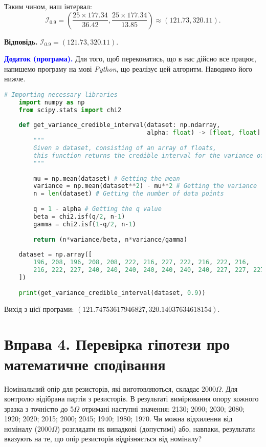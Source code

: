 \documentclass{../hw_template}
\begin{document}
Таким чином, наш інтервал:
\begin{equation*}
    \mathcal{I}_{0.9} = \left(\frac{25 \times 177.34}{36.42}, \frac{25 \times 177.34}{13.85}\right) \approx (121.73, 320.11).
\end{equation*}

\textbf{Відповідь.} $\mathcal{I}_{0.9} = (121.73, 320.11)$.

\textcolor{blue}{\textbf{Додаток (програма).}} Для того, щоб переконатись, що в нас дійсно все працює, напишемо програму на мові \textit{Python}, що реалізує цей алгоритм. Наводимо його нижче.

\begin{lstlisting}[language=Python]
    # Importing necessary libraries
    import numpy as np 
    from scipy.stats import chi2
    
    def get_variance_credible_interval(dataset: np.ndarray,
                                       alpha: float) -> [float, float]:
        """
        Given a dataset, consisting of an array of floats, 
        this function returns the credible interval for the variance of the dataset.
        """
        
        mu = np.mean(dataset) # Getting the mean
        variance = np.mean(dataset**2) - mu**2 # Getting the variance
        n = len(dataset) # Getting the number of data points
        
        q = 1 - alpha # Getting the q value
        beta = chi2.isf(q/2, n-1)
        gamma = chi2.isf(1-q/2, n-1)
        
        return (n*variance/beta, n*variance/gamma)
        
    dataset = np.array([
        196, 208, 196, 208, 208, 222, 216, 227, 222, 216, 222, 216,
        216, 222, 227, 240, 240, 240, 240, 240, 240, 240, 227, 227, 227
    ])
    
    print(get_variance_credible_interval(dataset, 0.9))
\end{lstlisting}

Вихід з цієї програми: $(121.74753617946827, 320.14037634618154)$.


\pagebreak

\section{Вправа 4. Перевірка гіпотези про математичне сподівання}

\begin{problem}
    Номінальний опір для резисторів, які виготовляються, складає 2000$\Omega$.
Для контролю відібрана партія з резисторів. В результаті вимірювання опору
кожного зразка з точністю до 5$\Omega$ отримані наступні значення: 2130; 2090;
2030; 2080; 1920; 2020; 2015; 2000; 2045; 1940; 1980; 1970. Чи можна
відхилення від номіналу (2000$\Omega$) розглядати як випадкові (допустимі) або,
навпаки, результати вказують на те, що опір резисторів відрізняється від номіналу?
\end{problem}
\end{document}
